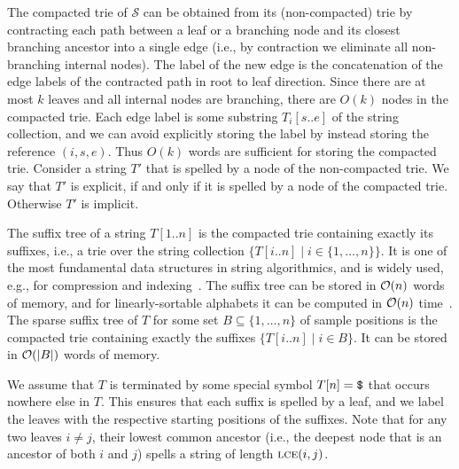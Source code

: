 The compacted trie of $\mathcal S$ can be obtained from its (non-compacted) trie by contracting each path between a leaf or a branching node and its closest branching ancestor into a single edge (i.e., by contraction we eliminate all non-branching internal nodes). The label of the new edge is the concatenation of the edge labels of the contracted path in root to leaf direction. Since there are at most $k$ leaves and all internal nodes are branching, there are $O(k)$ nodes in the compacted trie. Each edge label is some substring $T_i[s..e]$ of the string collection, and we can avoid explicitly storing the label by instead storing the reference $(i,s,e)$.  Thus $O(k)$ words are sufficient for storing the compacted trie. Consider a string $T'$ that is spelled by a node of the non-compacted trie. We say that $T'$ is explicit, if and only if it is spelled by a node of the compacted trie. 
Otherwise $T'$ is implicit.

The suffix tree of a string $T[1..n]$ is the compacted trie containing exactly its suffixes, i.e., a trie over the string collection $\{T[i..n] \mid i \in \{1, \dots, n\}\}$. It is one of the most fundamental data structures in string algorithmics, and is widely used, e.g., for compression and indexing~\cite{Gusfield1997}. The suffix tree can be stored in $\mathcal{O}(n)$ words of memory, and for linearly-sortable alphabets it can be computed in $\mathcal{O}(n)$ time~\cite{Farach1997}.
The sparse suffix tree of $T$ for some set $B \subseteq \{1, \dots, n\}$ of sample positions is the compacted trie containing exactly the suffixes $\{T[i..n] \mid i \in B\}$. It can be stored in $\mathcal{O}(\left\lvert B\right\rvert)$ words of memory.

We assume that $T$ is terminated by some special symbol $T[n] = \texttt\textdollar$ that occurs nowhere else in $T$. This ensures that each suffix is spelled by a leaf, and we label the leaves with the respective starting positions of the suffixes. Note that for any two leaves $i\neq j$, their lowest common ancestor (i.e., the deepest node that is an ancestor of both $i$ and $j$) spells a string of length $\textnormal{\textsc{lce}}(i, j)$.